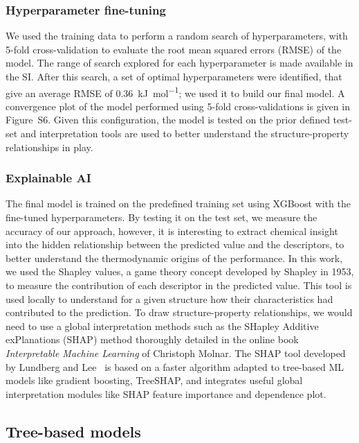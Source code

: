 \documentclass[main]{subfiles}
\begin{document}

\subsubsection{Hyperparameter fine-tuning}

We used the training data to perform a random search of hyperparameters, with 5-fold cross-validation to evaluate the root mean squared errors (RMSE) of the model. The range of search explored for each hyperparameter is made available in the SI. After this search, a set of optimal hyperparameters were identified, that give an average RMSE of \SI{0.36}{\kilo\joule\per\mole}; we used it to build our final model. A convergence plot of the model performed using 5-fold cross-validations is given in Figure~S6. Given this configuration, the model is tested on the prior defined test-set and interpretation tools are used to better understand the structure-property relationships in play.

\subsubsection{Explainable AI}


The final model is trained on the predefined training set using XGBoost with the fine-tuned hyperparameters. By testing it on the test set, we measure the accuracy of our approach, however, it is interesting to extract chemical insight into the hidden relationship between the predicted value and the descriptors, to better understand the thermodynamic origins of the performance. In this work, we used the Shapley values,\cite{shapley1953value} a game theory concept developed by Shapley in 1953, to measure the contribution of each descriptor in the predicted value. This tool is used locally to understand for a given structure how their characteristics had contributed to the prediction. To draw structure-property relationships, we would need to use a global interpretation methods such as the SHapley Additive exPlanations (SHAP) method thoroughly detailed in the online book \emph{Interpretable Machine Learning} of Christoph Molnar.\cite{molnar2020interpretable} The SHAP tool developed by Lundberg and Lee~\cite{SHAP} is based on a faster algorithm adapted to tree-based ML models like gradient boosting, TreeSHAP, and integrates useful global interpretation modules like SHAP feature importance and dependence plot.

\subsection{Tree-based models}
\end{document}
